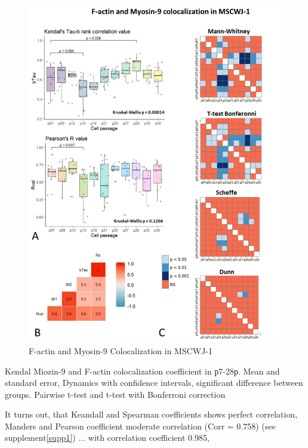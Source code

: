 \documentclass[english,authoryear]{elsarticle}
\begin{document}
\begin{figure}[hbt!]
\centering
\includegraphics[width=0.9\linewidth]{fig_m9-actin-col.jpg}
\caption{F-actin and Myosin-9 Colocalization in MSCWJ-1}
\label{m9-actin-col}
\end{figure}


Kendal Miozin-9 and F-actin colocalization coefficient in р7-28р. Mean and standard error, Dynamics with confidence intervals, significant difference between groups. Pairwise t-test and t-test with Bonferroni correction


It turns out, that Keandall and Spearman coefficients shows perfect correlation, Manders and Pearson coefficient moderate correlation (Corr = 0.758) (see supplement\ref{supp1}) ... with correlation coefficient 0.985,
\end{document}
